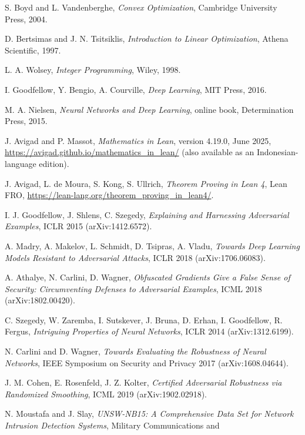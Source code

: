 \begin{sloppypar}
\begin{enumerate}[label={[\arabic*]},leftmargin=1.8em]
  \item S. Boyd and L. Vandenberghe, \emph{Convex Optimization}, Cambridge
        University Press, 2004.
  \item D. Bertsimas and J. N. Tsitsiklis, \emph{Introduction to Linear
        Optimization}, Athena Scientific, 1997.
  \item L. A. Wolsey, \emph{Integer Programming}, Wiley, 1998.
  \item I. Goodfellow, Y. Bengio, A. Courville, \emph{Deep Learning},
        MIT Press, 2016.
  \item M. A. Nielsen, \emph{Neural Networks and Deep Learning}, online book,
        Determination Press, 2015.
  \item J. Avigad and P. Massot, \emph{Mathematics in Lean}, version 4.19.0, June
        2025, \url{https://avigad.github.io/mathematics_in_lean/} (also available
        as an Indonesian-language edition).
  \item J. Avigad, L. de Moura, S. Kong, S. Ullrich, \emph{Theorem Proving in
        Lean 4}, Lean FRO, \url{https://lean-lang.org/theorem_proving_in_lean4/}.
  \item I. J. Goodfellow, J. Shlens, C. Szegedy, \emph{Explaining and Harnessing
        Adversarial Examples}, ICLR 2015 (arXiv:1412.6572).
  \item A. Madry, A. Makelov, L. Schmidt, D. Tsipras, A. Vladu,
        \emph{Towards Deep Learning Models Resistant to Adversarial Attacks},
        ICLR 2018 (arXiv:1706.06083).
  \item A. Athalye, N. Carlini, D. Wagner, \emph{Obfuscated Gradients Give a
        False Sense of Security: Circumventing Defenses to Adversarial
        Examples}, ICML 2018 (arXiv:1802.00420).
  \item C. Szegedy, W. Zaremba, I. Sutskever, J. Bruna, D. Erhan, I. Goodfellow,
        R. Fergus, \emph{Intriguing Properties of Neural Networks}, ICLR 2014
        (arXiv:1312.6199).
  \item N. Carlini and D. Wagner, \emph{Towards Evaluating the Robustness of
        Neural Networks}, IEEE Symposium on Security and Privacy 2017
        (arXiv:1608.04644).
  \item J. M. Cohen, E. Rosenfeld, J. Z. Kolter, \emph{Certified Adversarial
        Robustness via Randomized Smoothing}, ICML 2019 (arXiv:1902.02918).
  \item N. Moustafa and J. Slay, \emph{UNSW-NB15: A Comprehensive Data Set for
        Network Intrusion Detection Systems}, Military Communications and

\end{enumerate}
\end{sloppypar}
